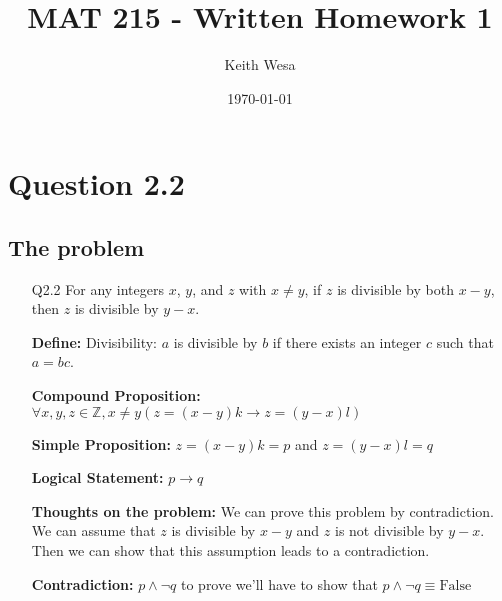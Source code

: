 \documentclass{article}
\author{Keith Wesa}
\title{MAT 215 - Written Homework 1}
\date{\today}
\begin{document}
\section*{Question 2.2}
\subsection*{The problem}
\begin{itemize}
    \item[Q2.2] For any integers $x$, $y$, and $z$ with $x \neq y$, if $z$ is divisible by both $x - y$, then $z$ is divisible by $y - x$.
    \item[] \textbf{Define: } Divisibility: $a$ is divisible by $b$ if there exists an integer $c$ such that $a = bc$.
    \item[] \textbf{Compound Proposition:} $\forall x, y, z \in \mathbb{Z}, x \neq y (z = (x - y)k \rightarrow z = (y - x)l)$
    \item[] \textbf{Simple Proposition:} $z = (x - y)k  = p$ and $z = (y - x)l = q$
    \item[] \textbf{Logical Statement:} $p \rightarrow q$
    \item[] \textbf{Thoughts on the problem: } We can prove this problem by contradiction. We can assume that $z$ is divisible by $x - y$ and $z$ is not divisible by $y - x$. 
    Then we can show that this assumption leads to a contradiction.
    \item[] \textbf{Contradiction:} $p \land \lnot q$ to prove we'll have to show that $p \land \lnot q \equiv \text{False}$
\end{itemize}
\end{document}
